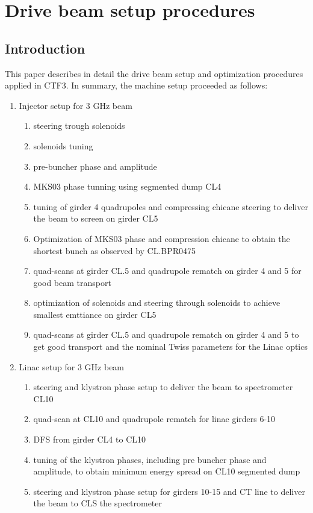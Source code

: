\chapter{Drive beam setup procedures}

\section{Introduction}

This paper describes in detail the drive beam setup and 
optimization procedures applied in CTF3.
In summary, the machine setup proceeded as follows:

\begin{enumerate}

\item Injector setup for 3 GHz beam
  \begin{enumerate}
    \item steering trough solenoids
    \item solenoids tuning
    \item pre-buncher phase and amplitude
    \item MKS03 phase tunning using segmented dump CL4
    \item tuning of girder 4 quadrupoles and compressing chicane steering 
          to deliver the beam to screen on girder CL5
    \item Optimization of MKS03 phase and compression chicane to obtain 
          the shortest bunch as observed by CL.BPR0475
    \item quad-scans at girder CL.5 and quadrupole rematch on girder 4 and 5 for good beam transport
    \item optimization of solenoids and steering through solenoids to 
          achieve smallest emttiance on girder CL5
    \item quad-scans at girder CL.5 and quadrupole rematch on girder 4 and 5 
          to get good transport and the nominal Twiss parameters for the Linac optics
  \end{enumerate}

\item Linac setup for 3 GHz beam
  \begin{enumerate}
    \item steering and klystron phase setup to deliver the beam to spectrometer CL10
    \item quad-scan at CL10 and quadrupole rematch for linac girders 6-10
    \item DFS from girder CL4 to CL10
    \item tuning of the klystron phases, including pre buncher phase and amplitude, to obtain
          minimum energy spread on CL10 segmented dump
    \item steering and klystron phase setup for girders 10-15 and CT line 
          to deliver the beam to CLS the spectrometer 
  \end{enumerate}


\end{enumerate}
